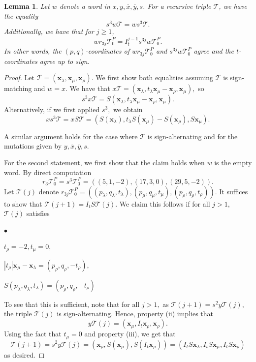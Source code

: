 \documentclass[11pt, reqno]{amsart}
\newtheorem{lemma}[thm]{Lemma}
\theoremstyle{remark}
\numberwithin{equation}{subsection}
\numberwithin{figure}{section}
\theoremstyle{customremark}
\newcommand{\Tt}{\mathcal{T}}
\newenvironment{itemlist}
   { \begin{list} {$\bullet$}
         { \setlength{\topsep}{.5ex}  \setlength{\itemsep}{.5ex} \setlength{\leftmargin}{2.5ex} } }
   { \end{list} }
\newcommand{\ov}{\overline}
\newcommand{\la}{{\lambda}}
\begin{document}
\begin{lemma} \label{lem:commuteS}
    Let $w$ denote a word in $x,y,\ov{x},\ov{y},s$.
    For a recursive triple $\Tt$, we have the equality \[s^3w\Tt=ws^3\Tt.\]  
    Additionally, we have that for $j\geq 1$,
    \[wr_{3j}\Tt_0^P=I_t^{j-1}s^{3j}w\Tt_0^P.\] In other words, the $(p,q)$-coordinates of $wr_{3j}\Tt_0^P$ and $s^{3j}w\Tt_0^P$ agree and the $t$-coordinates agree up to sign. 
\end{lemma}
\begin{proof}
    Let $\Tt=(\bm{x}_\la,\bm{x}_\mu,\bm{x}_\rho).$ We first show both equalities assuming $\Tt$ is sign-matching and $w=x.$
    We have that $x\Tt=(\bm{x}_\la,t_\la \bm{x}_\mu-\bm{x}_\rho,\bm{x}_\mu),$ so 
    \[ s^3x\Tt=S(\bm{x}_\la,t_\la \bm{x}_\mu-\bm{x}_\rho,\bm{x}_\mu).\]
    Alternatively, if we first applied $s^3,$ we obtain
    \[ xs^3\Tt=xS\Tt=(S(\bm{x}_\la),t_\la S(\bm{x}_\mu)-S(\bm{x}_\rho),S\bm{x}_\mu).\]
    
    A similar argument holds for the case where $\Tt$ is sign-alternating and for the mutations given by $y,\ov{x},\ov{y},s.$ 

    For the second statement, we first show that the claim holds when $w$ is the empty word.  By direct computation
    \[ r_3\Tt_0^P=s^3\Tt_{0}^P=\left( (5,1,-2),(17,3,0),(29,5,-2) \right).\] 
    Let $\Tt(j)$ denote $r_{3j}\Tt_0^P=((p_\la,q_\la,t_\la),(p_\mu,q_\mu,t_\mu),(p_\rho,q_\rho,t_\rho)).$  It suffices to show that $\Tt(j+1)=I_tS\Tt(j)$. We claim this follows if for all $j>1,$ $\Tt(j)$ satisfies
    \begin{itemlist}
        \item[{(i)}] $t_\rho=-2,t_\mu=0,$
        \item[{(ii)}] $|t_\rho|\bm{x}_\mu-\bm{x}_\la=(p_\rho,q_\rho,-t_\rho),$
        \item[{(iii)}] $S(p_\la,q_\la,t_\la)=(p_\rho,q_\rho,-t_\rho)$ 
    \end{itemlist}
    To see that this is sufficient, note that for all $j>1,$ as $\Tt(j+1)=s^2y\Tt(j),$ the triple $\Tt(j)$ is sign-alternating. Hence, property (ii)  implies that 
 \[ y\Tt(j)=(\bm{x}_\mu,I_t\bm{x}_\rho,\bm{x}_\rho).\]
 Using the fact that $t_\mu=0$ and property (iii), we get that 
 \[\Tt(j+1)=s^2y\Tt(j)=(\bm{x}_\rho,S(\bm{x}_\mu),S(I_t\bm{x}_\rho))=(I_tS\bm{x}_\la,I_tS\bm{x}_\mu,I_tS\bm{x}_\rho)\]
as desired. 


\end{proof}
\end{document}
